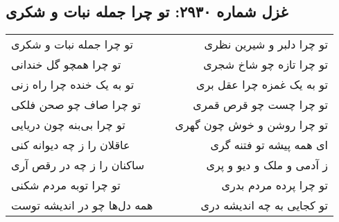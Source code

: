 \begin{center}
\section*{غزل شماره ۲۹۳۰: تو چرا جمله نبات و شکری}
\label{sec:2930}
\begin{longtable}{l p{0.5cm} r}
تو چرا جمله نبات و شکری
&&
تو چرا دلبر و شیرین نظری
\\
تو چرا همچو گل خندانی
&&
تو چرا تازه چو شاخ شجری
\\
تو به یک خنده چرا راه زنی
&&
تو به یک غمزه چرا عقل بری
\\
تو چرا صاف چو صحن فلکی
&&
تو چرا چست چو قرص قمری
\\
تو چرا بی‌بنه چون دریایی
&&
تو چرا روشن و خوش چون گهری
\\
عاقلان را ز چه دیوانه کنی
&&
ای همه پیشه تو فتنه گری
\\
ساکنان را ز چه در رقص آری
&&
ز آدمی و ملک و دیو و پری
\\
تو چرا توبه مردم شکنی
&&
تو چرا پرده مردم بدری
\\
همه دل‌ها چو در اندیشه توست
&&
تو کجایی به چه اندیشه دری
\\
\end{longtable}
\end{center}
